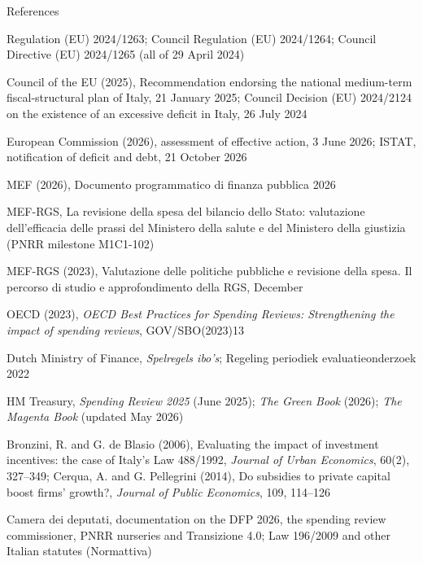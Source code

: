 \documentclass[aspectratio=169,xcolor=table]{beamer}
\begin{document}
\begin{frame}{References}
\tiny
\bi
  \item Regulation (EU) 2024/1263; Council Regulation (EU) 2024/1264; Council Directive (EU) 2024/1265 (all of 29 April 2024)
  \item Council of the EU (2025), Recommendation endorsing the national medium-term fiscal-structural plan of Italy, 21 January 2025; Council Decision (EU) 2024/2124 on the existence of an excessive deficit in Italy, 26 July 2024
  \item European Commission (2026), assessment of effective action, 3 June 2026; ISTAT, notification of deficit and debt, 21 October 2026
  \item MEF (2026), Documento programmatico di finanza pubblica 2026
  \item MEF-RGS, La revisione della spesa del bilancio dello Stato: valutazione dell'efficacia delle prassi del Ministero della salute e del Ministero della giustizia (PNRR milestone M1C1-102)
  \item MEF-RGS (2023), Valutazione delle politiche pubbliche e revisione della spesa. Il percorso di studio e approfondimento della RGS, December
  \item OECD (2023), \textit{OECD Best Practices for Spending Reviews: Strengthening the impact of spending reviews}, GOV/SBO(2023)13
  \item Dutch Ministry of Finance, \textit{Spelregels ibo's}; Regeling periodiek evaluatieonderzoek 2022
  \item HM Treasury, \textit{Spending Review 2025} (June 2025); \textit{The Green Book} (2026); \textit{The Magenta Book} (updated May 2026)
  \item Bronzini, R. and G. de Blasio (2006), Evaluating the impact of investment incentives: the case of Italy's Law 488/1992, \textit{Journal of Urban Economics}, 60(2), 327--349; Cerqua, A. and G. Pellegrini (2014), Do subsidies to private capital boost firms' growth?, \textit{Journal of Public Economics}, 109, 114--126
  \item Camera dei deputati, documentation on the DFP 2026, the spending review commissioner, PNRR nurseries and Transizione 4.0; Law 196/2009 and other Italian statutes (Normattiva)
\ei
{}
\end{frame}

\pelQuestions
\end{document}
